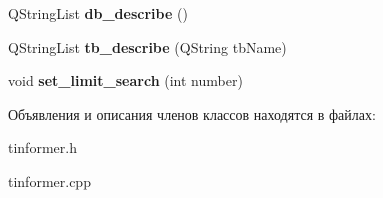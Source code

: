 \begin{DoxyCompactItemize}
\item 
\hypertarget{class_tinformer_af4c9bef17b780a742a1b852f59750a66}{\-Q\-String\-List {\bfseries db\-\_\-describe} ()}\label{class_tinformer_af4c9bef17b780a742a1b852f59750a66}

\item 
\hypertarget{class_tinformer_a9f9d4321ab117cf28d06c3e8df418030}{\-Q\-String\-List {\bfseries tb\-\_\-describe} (\-Q\-String tb\-Name)}\label{class_tinformer_a9f9d4321ab117cf28d06c3e8df418030}

\item 
\hypertarget{class_tinformer_adf329b3a89f5865b70a145aba654d89a}{void {\bfseries set\-\_\-limit\-\_\-search} (int number)}\label{class_tinformer_adf329b3a89f5865b70a145aba654d89a}

\end{DoxyCompactItemize}


Объявления и описания членов классов находятся в файлах\-:\begin{DoxyCompactItemize}
\item 
tinformer.\-h\item 
tinformer.\-cpp\end{DoxyCompactItemize}
